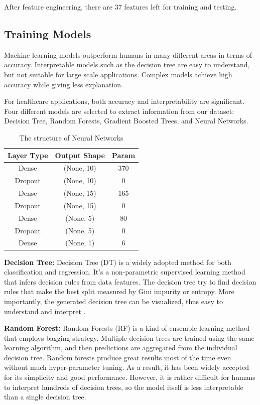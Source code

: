 \par
After feature engineering, there are 37 features left for training and testing.

\subsection{Training Models}

Machine learning models outperform humans in many different areas in terms of accuracy. Interpretable models such as the decision tree are easy to understand, but not suitable for large scale applications. Complex models achieve high accuracy while giving less explanation. 

For healthcare applications, both accuracy and interpretability are significant. Four different models are selected to extract information from our dataset: Decision Tree, Random Forests, Gradient Boosted Trees, and Neural Networks.

\begin{table}[H]
\centering
\begin{tabular}{@{}ccc@{}}
\toprule
Layer Type   & Output Shape & Param \\ \midrule
Dense & (None, 10) & 370           \\
Dropout & (None, 10) & 0           \\
Dense & (None, 15) & 165           \\
Dropout & (None, 15) & 0           \\
Dense & (None, 5) & 80           \\
Dropout & (None, 5) & 0           \\
Dense & (None, 1) & 6           \\
\bottomrule
\end{tabular}
\caption{The structure of Neural Networks}
\label{tab:nn}
\end{table}

\textbf{Decision Tree:} Decision Tree (DT) is a widely adopted method for both classification and regression. It's a non-parametric supervised learning method that infers decision rules from data features. The decision tree try to find decision rules that make the best split measured by Gini impurity or entropy. More importantly, the generated decision tree can be visualized, thus easy to understand and interpret \citep{Breiman2015Classification}.

\textbf{Random Forest:} Random Forests (RF) is a kind of ensemble learning method \citep{Breiman2001Random} that employs bagging strategy. Multiple decision trees are trained using the same learning algorithm, and then predictions are aggregated from the individual decision tree. Random forests produce great results most of the time even without much hyper-parameter tuning. As a result, it has been widely accepted for its simplicity and good performance. However, it is rather difficult for humans to interpret hundreds of decision trees, so the model itself is less interpretable than a single decision tree.

